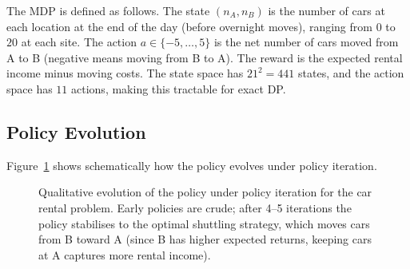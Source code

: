 The MDP is defined as follows.  The state $(n_A, n_B)$ is the number of cars at each location at the end of the day (before overnight moves), ranging from $0$ to $20$ at each site.  The action $a \in \{-5,\ldots,5\}$ is the net number of cars moved from A to B (negative means moving from B to A).  The reward is the expected rental income minus moving costs.  The state space has $21^2 = 441$ states, and the action space has $11$ actions, making this tractable for exact DP.

\subsection*{Policy Evolution}

Figure~\ref{fig:car-rental} shows schematically how the policy evolves under policy iteration.

\begin{figure}[ht]
\centering
{}
\caption{Qualitative evolution of the policy under policy iteration for the car rental problem.  Early policies are crude; after 4--5 iterations the policy stabilises to the optimal shuttling strategy, which moves cars from B toward A (since B has higher expected returns, keeping cars at A captures more rental income).}
\label{fig:car-rental}
\end{figure}

